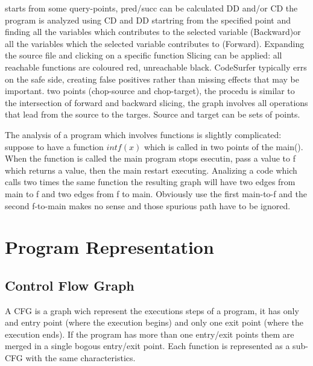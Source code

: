 \begin{itemize}
	 starts from some query-points, pred/succ can be calculated DD and/or CD
	 the program is analyzed using CD and DD startring from the specified point and finding all the variables which contributes to the selected variable (Backward)or all the variables which the selected variable contributes to (Forward). Expanding the source file and clicking on a specific function Slicing can be applied: all reachable functions are coloured red, unreachable black. CodeSurfer typically errs on the safe side, creating false positives rather than missing effects that may be important.
	 two points (chop-source and chop-target), the procedu is similar to the intersection of forward and backward slicing, the graph involves all operations that lead from the source to the targes. Source and target can be sets of points. 
\end{itemize}

The analysis of a program which involves functions is slightly complicated: suppose to have a function $int f(x)$ which is called in two points of the main(). When the function is called the main program stops esecutin, pass a value to f which returns a value, then the main restart executing. Analizing a code which calls two times the same function the resulting graph will have two edges from main to f and two edges from f to main. Obviously use the first main-to-f and the second f-to-main makes no sense and those spurious path have to be ignored.


\section{Program Representation}
\subsection{Control Flow Graph}
A CFG is a graph wich represent the executions steps of a program, it has only and entry point (where the execution begins) and only one exit point (where the execution ends). If the program has more than one entry/exit points them are merged in a single bogous entry/exit point. Each function is represented as a sub-CFG with the same characteristics.
